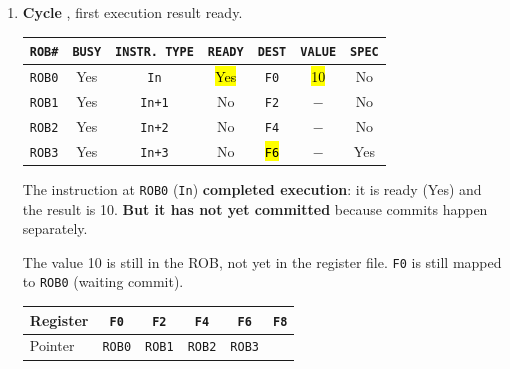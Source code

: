 \begin{examplebox}
\begin{enumerate}
        \item \textbf{Cycle \theenumi}, first execution result ready.
        \begin{center}
            \begin{tabular}{@{} c | c | c | c | c | c | c @{}}
                \toprule
                \texttt{ROB\#} & \texttt{BUSY} & \texttt{INSTR. TYPE} & \texttt{READY} & \texttt{DEST} & \texttt{VALUE} & \texttt{SPEC} \\
                \midrule
                \texttt{ROB0} & Yes         & \texttt{In}           & \hl{Yes}  & \texttt{F0}       & \hl{10}   & No            \\ [.3em]
                \texttt{ROB1} & Yes         & \texttt{In+1}         & No        & \texttt{F2}       & $-$       & No            \\ [.3em]
                \texttt{ROB2} & Yes         & \texttt{In+2}         & No        & \texttt{F4}       & $-$       & No            \\ [.3em]
                \texttt{ROB3} & Yes         & \texttt{In+3}         & No        & \hl{\texttt{F6}}  & $-$       & Yes           \\
                \bottomrule
            \end{tabular}
        \end{center}
        The instruction at \texttt{ROB0} (\texttt{In}) \textbf{completed execution}: it is ready (Yes) and the result is 10. \textbf{But it has not yet committed} because commits happen separately.

        The value 10 is still in the ROB, not yet in the register file. \texttt{F0} is still mapped to \texttt{ROB0} (waiting commit).
        \begin{center}
            \begin{tabular}{@{} l | c c c c c @{}}
                \toprule
                Register    & \texttt{F0}   & \texttt{F2}   & \texttt{F4}           & \texttt{F6}           & \texttt{F8} \\
                \midrule
                Pointer     & \texttt{ROB0} & \texttt{ROB1} & \texttt{ROB2}         & \texttt{ROB3}         &             \\
                \bottomrule
            \end{tabular}
        \end{center}


        \newpage



\end{enumerate}
\end{examplebox}
